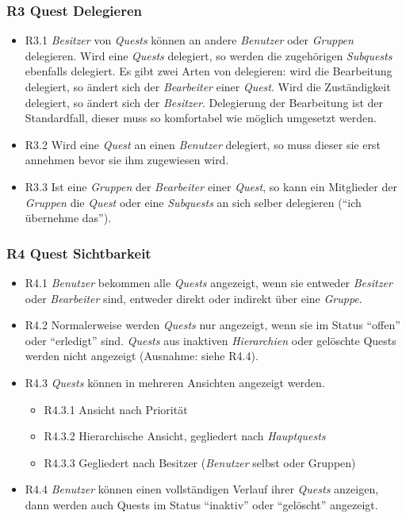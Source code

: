 \documentclass{article}
\begin{document}
\subsubsection{R3 Quest Delegieren}

\begin{itemize}
	\item{R3.1} \textit{Besitzer} von \textit{Quests} können an andere \textit{Benutzer} oder \textit{Gruppen} delegieren. Wird eine \textit{Quests} delegiert, so werden die zugehörigen \textit{Subquests} ebenfalls delegiert. Es gibt zwei Arten von delegieren: wird die Bearbeitung delegiert, so ändert sich der \textit{Bearbeiter} einer \textit{Quest}. Wird die Zuständigkeit delegiert, so ändert sich der \textit{Besitzer}. Delegierung der Bearbeitung ist der Standardfall, dieser muss so komfortabel wie möglich umgesetzt werden. 
	\item{R3.2} Wird eine  \textit{Quest} an einen \textit{Benutzer} delegiert, so muss dieser sie erst annehmen bevor sie ihm zugewiesen wird. 
	\item{R3.3} Ist eine \textit{Gruppen} der \textit{Bearbeiter} einer \textit{Quest}, so kann ein Mitglieder der \textit{Gruppen} die \textit{Quest} oder eine \textit{Subquests} an sich selber delegieren (``ich übernehme das'').
\end{itemize}

\subsubsection{R4 Quest Sichtbarkeit}

\begin{itemize}
	\item{R4.1} \textit{Benutzer} bekommen alle  \textit{Quests} angezeigt, wenn sie entweder \textit{Besitzer} oder \textit{Bearbeiter} sind, entweder direkt oder indirekt über eine \textit{Gruppe}.
	\item{R4.2} Normalerweise werden \textit{Quests} nur angezeigt, wenn sie im Status ``offen'' oder ``erledigt'' sind. \textit{Quests} aus inaktiven  \textit{Hierarchien} oder gelöschte Quests werden nicht angezeigt (Ausnahme: siehe R4.4). 
	\item{R4.3}  \textit{Quests} können in mehreren Ansichten angezeigt werden.

\begin{itemize}
	\item{R4.3.1} Ansicht nach  Priorität
	\item{R4.3.2} Hierarchische Ansicht, gegliedert nach \textit{Hauptquests}
	\item{R4.3.3} Gegliedert nach Besitzer (\textit{Benutzer}  selbst oder Gruppen)
\end{itemize}

	\item{R4.4} \textit{Benutzer} können einen vollständigen Verlauf ihrer  \textit{Quests} anzeigen, dann werden auch Quests im Status ``inaktiv'' oder ``gelöscht'' angezeigt. 
\end{itemize}
\end{document}
